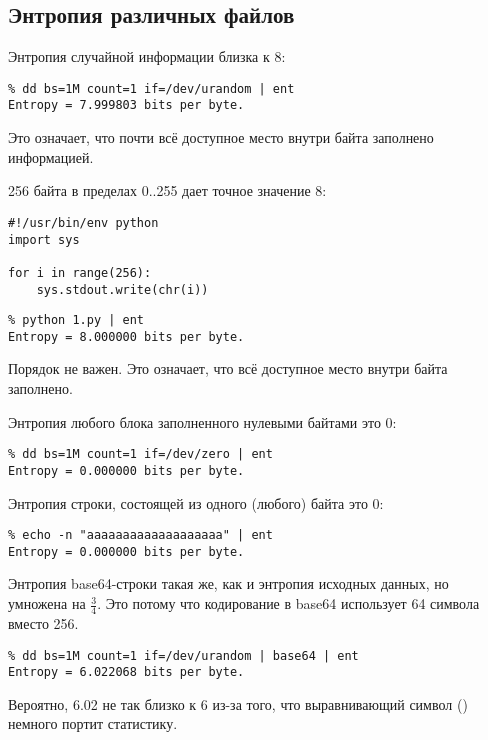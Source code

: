 \subsection{Энтропия различных файлов}

Энтропия случайной информации близка к 8:

\begin{lstlisting}
% dd bs=1M count=1 if=/dev/urandom | ent
Entropy = 7.999803 bits per byte.
\end{lstlisting}

Это означает, что почти всё доступное место внутри байта заполнено информацией.

256 байта в пределах 0..255 дает точное значение 8:

\begin{lstlisting}[style=custompy]
#!/usr/bin/env python
import sys

for i in range(256):
    sys.stdout.write(chr(i))
\end{lstlisting}

\begin{lstlisting}
% python 1.py | ent
Entropy = 8.000000 bits per byte.
\end{lstlisting}

Порядок не важен.
Это означает, что всё доступное место внутри байта заполнено.

Энтропия любого блока заполненного нулевыми байтами это 0:

\begin{lstlisting}
% dd bs=1M count=1 if=/dev/zero | ent
Entropy = 0.000000 bits per byte.
\end{lstlisting}

Энтропия строки, состоящей из одного (любого) байта это 0:

\begin{lstlisting}
% echo -n "aaaaaaaaaaaaaaaaaaa" | ent
Entropy = 0.000000 bits per byte.
\end{lstlisting}

Энтропия base64-строки такая же, как и энтропия исходных данных, но умножена на $\frac{3}{4}$.
Это потому что кодирование в base64 использует 64 символа вместо 256.

\begin{lstlisting}
% dd bs=1M count=1 if=/dev/urandom | base64 | ent
Entropy = 6.022068 bits per byte.
\end{lstlisting}

Вероятно, 6.02 не так близко к 6 из-за того, что выравнивающий символ (\TT{=}) немного портит статистику.

